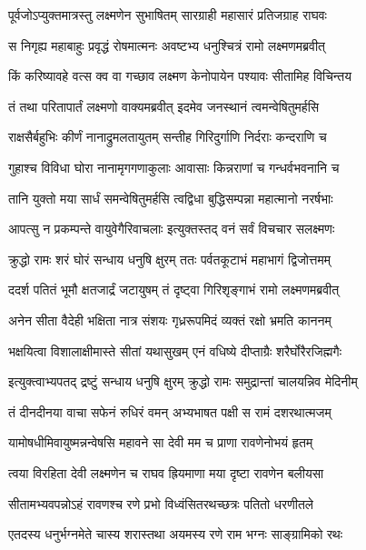 
\twolineshloka
{पूर्वजोऽप्युक्तमात्रस्तु लक्ष्मणेन सुभाषितम्}
{सारग्राही महासारं प्रतिजग्राह राघवः} %

\twolineshloka
{स निगृह्य महाबाहुः प्रवृद्धं रोषमात्मनः}
{अवष्टभ्य धनुश्चित्रं रामो लक्ष्मणमब्रवीत्} %

\twolineshloka
{किं करिष्यावहे वत्स क्व वा गच्छाव लक्ष्मण}
{केनोपायेन पश्यावः सीतामिह विचिन्तय} %

\twolineshloka
{तं तथा परितापार्तं लक्ष्मणो वाक्यमब्रवीत्}
{इदमेव जनस्थानं त्वमन्वेषितुमर्हसि} %

\twolineshloka
{राक्षसैर्बहुभिः कीर्णं नानाद्रुमलतायुतम्}
{सन्तीह गिरिदुर्गाणि निर्दराः कन्दराणि च} %

\twolineshloka
{गुहाश्च विविधा घोरा नानामृगगणाकुलाः}
{आवासाः किन्नराणां च गन्धर्वभवनानि च} %

\twolineshloka
{तानि युक्तो मया सार्धं समन्वेषितुमर्हसि}
{त्वद्विधा बुद्धिसम्पन्ना महात्मानो नरर्षभाः} %

\twolineshloka
{आपत्सु न प्रकम्पन्ते वायुवेगैरिवाचलाः}
{इत्युक्तस्तद् वनं सर्वं विचचार सलक्ष्मणः} %

\twolineshloka
{क्रुद्धो रामः शरं घोरं सन्धाय धनुषि क्षुरम्}
{ततः पर्वतकूटाभं महाभागं द्विजोत्तमम्} %

\twolineshloka
{ददर्श पतितं भूमौ क्षतजार्द्रं जटायुषम्}
{तं दृष्ट्वा गिरिशृङ्गाभं रामो लक्ष्मणमब्रवीत्} %

\twolineshloka
{अनेन सीता वैदेही भक्षिता नात्र संशयः}
{गृध्ररूपमिदं व्यक्तं रक्षो भ्रमति काननम्} %

\twolineshloka
{भक्षयित्वा विशालाक्षीमास्ते सीतां यथासुखम्}
{एनं वधिष्ये दीप्ताग्रैः शरैर्घोरैरजिह्मगैः} %

\twolineshloka
{इत्युक्त्वाभ्यपतद् द्रष्टुं सन्धाय धनुषि क्षुरम्}
{क्रुद्धो रामः समुद्रान्तां चालयन्निव मेदिनीम्} %

\twolineshloka
{तं दीनदीनया वाचा सफेनं रुधिरं वमन्}
{अभ्यभाषत पक्षी स रामं दशरथात्मजम्} %

\twolineshloka
{यामोषधीमिवायुष्मन्नन्वेषसि महावने}
{सा देवी मम च प्राणा रावणेनोभयं हृतम्} %

\twolineshloka
{त्वया विरहिता देवी लक्ष्मणेन च राघव}
{ह्रियमाणा मया दृष्टा रावणेन बलीयसा} %

\twolineshloka
{सीतामभ्यवपन्नोऽहं रावणश्च रणे प्रभो}
{विध्वंसितरथच्छत्रः पतितो धरणीतले} %

\twolineshloka
{एतदस्य धनुर्भग्नमेते चास्य शरास्तथा}
{अयमस्य रणे राम भग्नः साङ्ग्रामिको रथः} %

